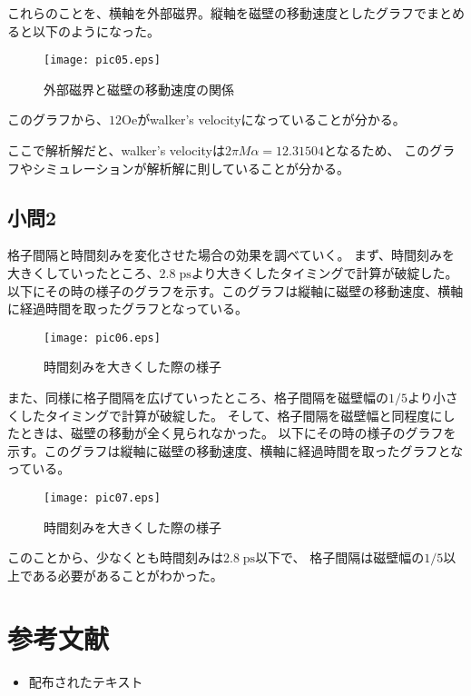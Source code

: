 \documentclass{jsarticle}
\begin{document}
これらのことを、横軸を外部磁界。縦軸を磁壁の移動速度としたグラフでまとめると以下のようになった。
\begin{figure}[H]
	\centering
	\texttt{[image: pic05.eps]}
	\caption{外部磁界と磁壁の移動速度の関係}
	\label{fig05}
\end{figure}
このグラフから、$12\mathrm{Oe}$がwalker's velocityになっていることが分かる。

ここで解析解だと、walker's velocityは$2\pi M \alpha = 12.31504$となるため、
このグラフやシミュレーションが解析解に則していることが分かる。

\subsection{小問2}
格子間隔と時間刻みを変化させた場合の効果を調べていく。
まず、時間刻みを大きくしていったところ、$2.8\;\mathrm{ps}$より大きくしたタイミングで計算が破綻した。
以下にその時の様子のグラフを示す。このグラフは縦軸に磁壁の移動速度、横軸に経過時間を取ったグラフとなっている。
\begin{figure}[H]
	\centering
	\texttt{[image: pic06.eps]}
	\caption{時間刻みを大きくした際の様子}
	\label{fig06}
\end{figure}

また、同様に格子間隔を広げていったところ、格子間隔を磁壁幅の$1/5$より小さくしたタイミングで計算が破綻した。
そして、格子間隔を磁壁幅と同程度にしたときは、磁壁の移動が全く見られなかった。
以下にその時の様子のグラフを示す。このグラフは縦軸に磁壁の移動速度、横軸に経過時間を取ったグラフとなっている。
\begin{figure}[H]
	\centering
	\texttt{[image: pic07.eps]}
	\caption{時間刻みを大きくした際の様子}
	\label{fig07}
\end{figure}

このことから、少なくとも時間刻みは$2.8\;\mathrm{ps}$以下で、
格子間隔は磁壁幅の$1/5$以上である必要があることがわかった。

\section{参考文献}

\begin{itemize}
  \item 配布されたテキスト
\end{itemize}
\end{document}
